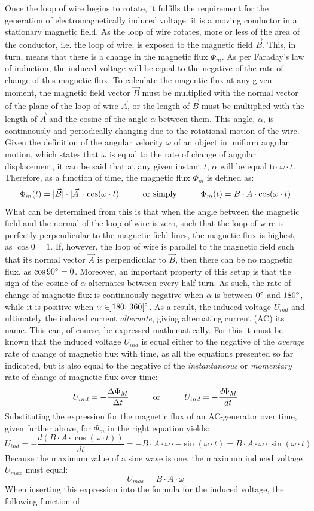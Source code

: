 Once the loop of wire begins to rotate, it fulfills the requirement for the generation of electromagnetically induced voltage: it is a moving conductor in a stationary magnetic field. As the loop of wire rotates, more or less of the area of the conductor, i.e. the loop of wire, is exposed to the magnetic field $\vec{B}$. This, in turn, means that there is a change in the magnetic flux $\Phi_m$. As per Faraday's law of induction, the induced voltage will be equal to the negative of the rate of change of this magnetic flux. To calculate the magentic flux at any given moment, the magnetic field vector $\vec{B}$ must be multiplied with the normal vector of the plane of the loop of wire $\vec{A}$, or the length of $\vec{B}$ must be multiplied with the length of $\vec{A}$ and the cosine of the angle $\alpha$ between them. This angle, $\alpha$, is continuously and periodically changing due to the rotational motion of the wire. Given the definition of the angular velocity $\omega$ of an object in uniform angular motion, which states that $\omega$ is equal to the rate of change of angular displacement, it can be said that at any given instant $t$, $\alpha$ will be equal to $\omega \cdot t$. Therefore, as a function of time, the magnetic flux $\Phi_m$ is defined as: $$\Phi_m(t) = |\vec{B}| \cdot |\vec{A}| \cdot \cos(\omega \cdot t) \mathtext{1}{or simply} \Phi_m(t) = B \cdot A \cdot \cos(\omega \cdot t)$$ What can be determined from this is that when the angle between the magnetic field and the normal of the loop of wire is zero, such that the loop of wire is perfectly perpendicular to the magnetic field lines, the magnetic flux is highest, as $\cos 0 = 1$. If, however, the loop of wire is parallel to the magnetic field such that its normal vector $\vec{A}$ is perpendicular to $\vec{B}$, then there can be no magnetic flux, as $\cos 90\degree = 0$. Moreover, an important property of this setup is that the sign of the cosine of $\alpha$ alternates between every half turn. As such, the rate of change of magnetic flux is continuously negative when $\alpha$ is between $0 \degree$ and $180\degree$, while it is positive when $\alpha \in ]180;\, 360[\degree$. As a result, the induced voltage $U_{ind}$ and ultimately the induced current \emph{alternate}, giving alternating current (AC) its name. This can, of course, be expressed mathematically. For this it must be known that the induced voltage $U_{ind}$ is equal either to the negative of the \emph{average} rate of change of magnetic flux with time, as all the equations presented so far indicated, but is also equal to the negative of the \emph{instantaneous} or \emph{momentary} rate of change of magnetic flux over time: $$U_{ind} = - \frac{\Delta \Phi_M}{\Delta t} \OR U_{ind} = -\frac{d \Phi_M}{dt}$$ Substituting the expression for the magnetic flux of an AC-generator over time, given further above, for $\Phi_m$ in the right equation yields: $$U_{ind} = -\frac{d(B \cdot A \cdot \cos(\omega \cdot t))}{dt} = -B \cdot A \cdot \omega \cdot -\sin(\omega \cdot t) = B \cdot A \cdot \omega \cdot \sin(\omega \cdot t)$$ Because the maximum value of a sine wave is one, the maximum induced voltage $U_{max}$ must equal: $$U_{max} = B \cdot A \cdot \omega$$ When inserting this expression into the formula for the induced voltage, the following function of 